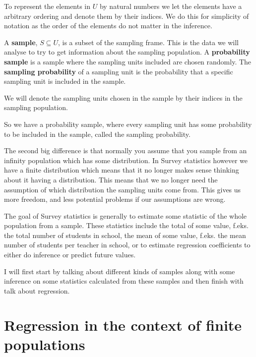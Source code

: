 \documentclass{article}
\begin{document}
To represent the elements in \(U\) by natural numbers we let the elements
have a arbitrary ordering and denote them by their indices. We do this for
simplicity of notation as the order of the elements do not matter in the inference.


\begin{definition} \label{def:sample}
A \textbf{sample}, \(S \subseteq U\), is a subset of the sampling frame. This is the data we will analyse to try to get information about the sampling population.
A \textbf{probability sample} is a sample where the sampling units included are chosen randomly.
The \textbf{sampling probability} of a sampling unit is the probability that a specific sampling unit is included in the sample.
\end{definition}

We will denote the sampling units chosen in the sample by their indices in the
sampling population.

So we have a probability sample, where every sampling unit has some probability to be included in the sample, called the sampling probability.

\vspace{5mm}

The second big difference is that normally you assume that you sample from an
infinity population which has some distribution. In Survey statistics however we
have a finite distribution which means that it no longer makes sense thinking
about it having a distribution. This means that we no longer need the assumption
of which distribution the sampling units come from. This gives us more freedom,
and less potential problems if our assumptions are wrong.


The goal of Survey statistics is generally to estimate some statistic of the whole
population from a sample. These statistics include the total of some value,
f.eks. the total number of students in school, the mean of some value, f.eks.
the mean number of students per teacher in school, or to estimate regression
coefficients to either do inference or predict future values.

I will first start by talking about different kinds of samples along with some
inference on some statistics calculated from these samples and then finish with
talk about regression.


\section{Regression in the context of finite populations}
\end{document}
